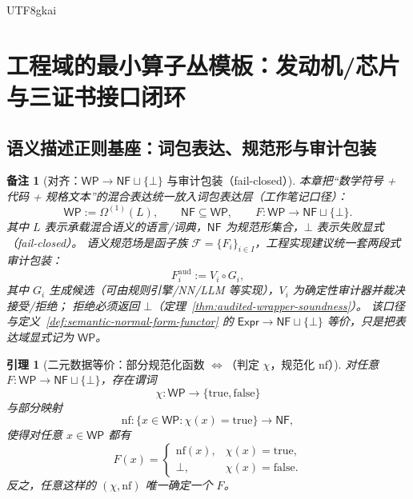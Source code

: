 \documentclass[12pt]{article}
\newtheorem{lemma}{引理}[section]
\newtheorem{remark}{备注}[section]
\begin{document}
\begin{CJK*}{UTF8}{gkai}
\section{工程域的最小算子丛模板：发动机/芯片与三证书接口闭环}
\label{sec:eng-minimal-operator-bundle-templates}

\subsection{语义描述正则基座：词包表达、规范形与审计包装}
\label{sec:eng-minimal-semantic-base}

\begin{remark}[对齐：$\mathsf{WP}\to \mathsf{NF}\sqcup\{\bot\}$ 与审计包装（fail-closed）]
本章把“数学符号 + 代码 + 规格文本”的混合表达统一放入词包表达层（工作笔记口径）：
\[
  \mathsf{WP}:=\Omega^{(1)}(L),\qquad \mathsf{NF}\subseteq\mathsf{WP},\qquad
  F:\mathsf{WP}\to \mathsf{NF}\sqcup\{\bot\}.
\]
其中 $L$ 表示承载混合语义的语言/词典，$\mathsf{NF}$ 为规范形集合，$\bot$ 表示失败显式（fail-closed）。
语义规范场是函子族 $\mathcal{F}=\{F_i\}_{i\in I}$，工程实现建议统一套两段式审计包装：
\[
  F_i^{\mathrm{aud}}:=V_i\circ G_i,
\]
其中 $G_i$ 生成候选（可由规则引擎/NN/LLM 等实现），$V_i$ 为确定性审计器并裁决接受/拒绝；
拒绝必须返回 $\bot$（定理~\ref{thm:audited-wrapper-soundness}）。
该口径与定义~\ref{def:semantic-normal-form-functor} 的 $\mathsf{Expr}\to\mathsf{NF}\sqcup\{\bot\}$ 等价，只是把表达域显式记为 $\mathsf{WP}$。
\end{remark}

\begin{lemma}[二元数据等价：部分规范化函数 $\Leftrightarrow$（判定 $\chi$，规范化 $\mathrm{nf}$）]
\label{lem:eng-minimal-f-equivalence}
对任意 $F:\mathsf{WP}\to \mathsf{NF}\sqcup\{\bot\}$，存在谓词
\[
  \chi:\mathsf{WP}\to\{\mathrm{true},\mathrm{false}\}
\]
与部分映射
\[
  \mathrm{nf}:\{x\in\mathsf{WP}:\chi(x)=\mathrm{true}\}\to \mathsf{NF},
\]
使得对任意 $x\in\mathsf{WP}$ 都有
\[
  F(x)=
  \begin{cases}
    \mathrm{nf}(x),&\chi(x)=\mathrm{true},\\
    \bot,&\chi(x)=\mathrm{false}.
  \end{cases}
\]
反之，任意这样的 $(\chi,\mathrm{nf})$ 唯一确定一个 $F$。
\end{lemma}


\end{CJK*}
\end{document}
